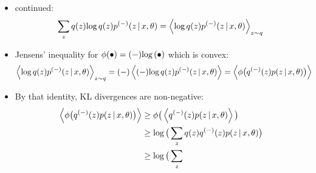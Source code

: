 \begin{frame} [t] 
\begin{itemize}
    \item continued:
        { \footnotesize
          \begin{align*}
                \sum _{z}  q(z) 
                 \textnormal{log}\, q(z) p ^{(-)} 
                            ( z \,\vert\, x,\theta )
              = 
                \expval 
                { \textnormal{log}\,q(z) p ^{(-)} 
                             ( z \,\vert\, x,\theta )
                } _{z \sim q}
          \end{align*}  
        }
    \item Jensens' inequality for 
        $ \phi (\bullet) = (-) \textnormal{log}\, (\bullet)$ 
        which is convex:
        { \footnotesize 
        \begin{align*}
            \expval 
            { \textnormal{log}\,q(z) p ^{(-)} 
                         ( z \,\vert\, x,\theta )
            }  _{z \sim q}
           & = 
            (-)
            \expval 
            { (-)\textnormal{log}\,q(z) p ^{(-)} 
                         ( z \,\vert\, x,\theta )
            }  
           = 
            \expval 
            { \phi \big( 
                        q ^{(-)} (z) p 
                         ( z \,\vert\, x,\theta )
                    \big)
            } 
        \end{align*}    
        }
    \item 
        By that identity, KL divergences 
        are non-negative:
        { \footnotesize
        \begin{align*}
            \expval 
            { \phi \big( 
                        q ^{(-)} (z) p 
                        \conditional 
                        {z} {x,\theta}
                    \big)
            } 
        & \geq 
            \phi \big(
            \expval 
            { 
                q ^{(-)} (z) p 
                \conditional 
                {z} {x,\theta}
            } \big)
        \\ & \geq 
            \varlog \big(
            \sum _{z} 
              q (z)
              q ^{(-)} (z)  
              p \conditional 
                 {z} {x,\theta} 
            \big)
        \\ & \geq 
            \varlog \big(
            \sum _{z} 

\end{align*}}
\end{itemize}
\end{frame}
